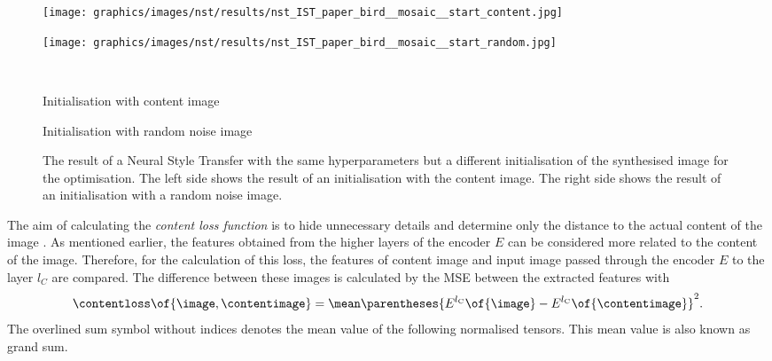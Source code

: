 \begin{figure}[h]
	\centering
	\begin{minipage}{.5\textwidth}
		\centering
		\texttt{[image: graphics/images/nst/results/nst\_IST\_paper\_bird\_\_mosaic\_\_start\_content.jpg]}
	\end{minipage}%
	\begin{minipage}{.5\textwidth}
		\centering
		\texttt{[image: graphics/images/nst/results/nst\_IST\_paper\_bird\_\_mosaic\_\_start\_random.jpg]}
	\end{minipage}\\ \vspace{0.15cm}
	\begin{minipage}{.5\textwidth}
		\centering
		Initialisation with content image
	\end{minipage}%
	\begin{minipage}{.5\textwidth}
		\centering
		Initialisation with random noise image
	\end{minipage}
	\caption{The result of a Neural Style Transfer with the same hyperparameters but a different initialisation of the synthesised image for the optimisation. The left side shows the result of an initialisation with the content image. The right side shows the result of an initialisation with a random noise image.}
	\label{fig:diff_init_nst}
\end{figure}

The aim of calculating the \emph{content loss function} \contentloss{} is to hide unnecessary details and determine only the distance to the actual content of the image \cite{Glas2021}. As mentioned earlier, the features obtained from the higher layers of the encoder $E$ can be considered more related to the content of the image. Therefore, for the calculation of this loss, the features of content image and input image passed through the encoder $E$ to the layer $l_C$ are compared. The difference between these images is calculated by the \gls{MSE} between the extracted features with \cite{GEB2016}
\begin{equation*}
	\contentloss\of{\image\eqcommasep \contentimage} = \mean \parentheses{E^{l_\text{C}}\of{\image} - E^{l_\text{C}}\of{\contentimage}}^2 \eqtextdot
\end{equation*}
The overlined sum symbol without indices denotes the mean value of the following normalised tensors. This mean value is also known as grand sum.

